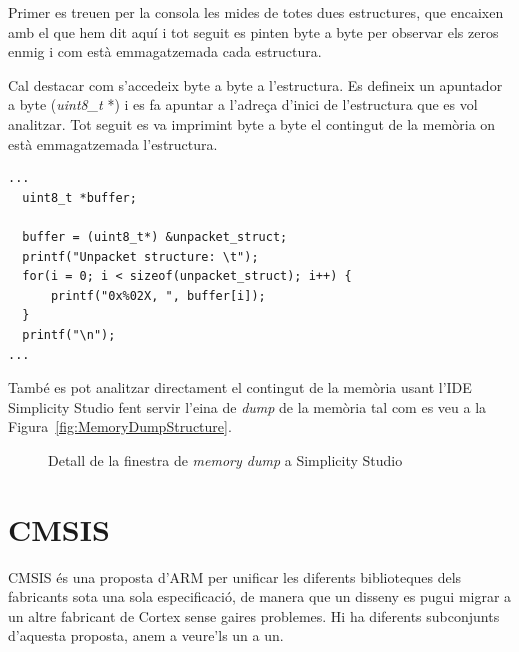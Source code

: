 Primer es treuen per la consola les mides de totes dues estructures, que encaixen amb el que hem dit aquí i tot seguit es pinten byte a byte per observar els zeros enmig i com està emmagatzemada cada estructura.

Cal destacar com s'accedeix byte a byte a l'estructura. Es defineix un apuntador a byte ({\em uint8\_t} *) i es fa apuntar a l'adreça d'inici de l'estructura que es vol analitzar. Tot seguit es va imprimint byte a byte el contingut de la memòria on està emmagatzemada l'estructura.

\begin{lstlisting}[style=customc,caption={Estructura d'exemple empaquetada},label=struct_example]
...
  uint8_t *buffer;

  buffer = (uint8_t*) &unpacket_struct;
  printf("Unpacket structure: \t");
  for(i = 0; i < sizeof(unpacket_struct); i++) {
	  printf("0x%02X, ", buffer[i]);
  }
  printf("\n");
...
\end{lstlisting}


També es pot analitzar directament el contingut de la memòria usant l'IDE Simplicity Studio fent servir l'eina de {\em dump} de la memòria tal com es veu a la Figura~\ref{fig:MemoryDumpStructure}.

\begin{figure}
 \centering
 \caption{Detall de la finestra de {\em memory dump} a Simplicity Studio}
 \label{fig:UnpackedMemoryStructure}
\end{figure}


\chapter{CMSIS}
\label{ch:CMSIS}
\gls{CMSIS} és una proposta d'ARM per unificar les diferents biblioteques dels fabricants sota una sola especificació, de manera que un disseny es pugui migrar a un altre fabricant de Cortex sense gaires problemes. Hi ha diferents subconjunts d'aquesta proposta, anem a veure'ls un a un.

